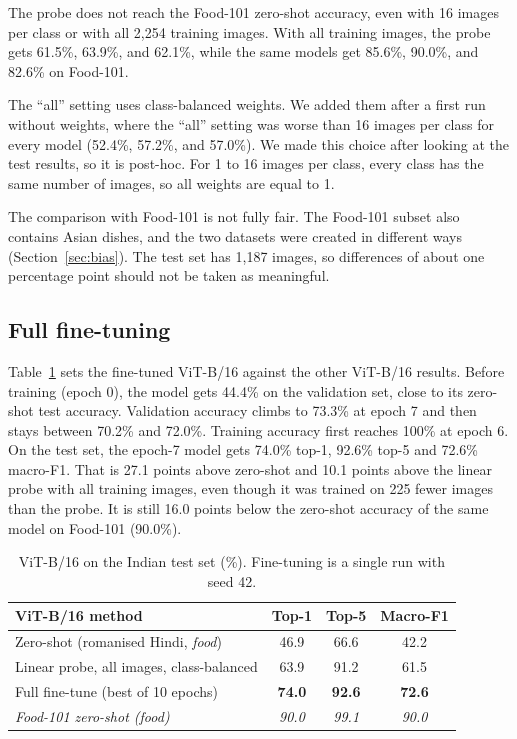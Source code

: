 \documentclass[twoside,a4paper,11pt]{article}
\begin{document}
The probe does not reach the Food-101 zero-shot accuracy, even with 16 images per class or with all 2{,}254 training images. With all training images, the probe gets 61.5\%, 63.9\%, and 62.1\%, while the same models get 85.6\%, 90.0\%, and 82.6\% on Food-101.

The ``all'' setting uses class-balanced weights. We added them after a first run without weights, where the ``all'' setting was worse than 16 images per class for every model (52.4\%, 57.2\%, and 57.0\%). We made this choice after looking at the test results, so it is post-hoc. For 1 to 16 images per class, every class has the same number of images, so all weights are equal to 1.

The comparison with Food-101 is not fully fair. The Food-101 subset also contains Asian dishes, and the two datasets were created in different ways (Section~\ref{sec:bias}). The test set has 1{,}187 images, so differences of about one percentage point should not be taken as meaningful.

\subsection{Full fine-tuning}\label{sec:ft-results}  %
Table~\ref{tab:ft} sets the fine-tuned ViT-B/16 against the other ViT-B/16 results. Before training (epoch 0), the
model gets 44.4\% on the validation set, close to its zero-shot test accuracy. Validation accuracy climbs to 73.3\% at
epoch 7 and then stays between 70.2\% and 72.0\%. Training accuracy first reaches 100\% at epoch 6. On the test set,
the epoch-7 model gets 74.0\% top-1, 92.6\% top-5 and 72.6\% macro-F1. That is 27.1 points above zero-shot and 10.1
points above the linear probe with all training images, even though it was trained on 225 fewer images than the probe.
It is still 16.0 points below the zero-shot accuracy of the same model on Food-101 (90.0\%).

\begin{table}[htbp]
\centering
\small
\begin{tabular}{lccc}
\hline
ViT-B/16 method & Top-1 & Top-5 & Macro-F1 \\
\hline
Zero-shot (romanised Hindi, \emph{food}) & 46.9 & 66.6 & 42.2 \\
Linear probe, all images, class-balanced & 63.9 & 91.2 & 61.5 \\
Full fine-tune (best of 10 epochs) & \textbf{74.0} & \textbf{92.6} & \textbf{72.6} \\
\hline
\textit{Food-101 zero-shot (\emph{food})} & \textit{90.0} & \textit{99.1} & \textit{90.0} \\
\hline
\end{tabular}
\caption{ViT-B/16 on the Indian test set (\%). Fine-tuning is a single run with seed 42.}
\label{tab:ft}
\end{table}
\end{document}
